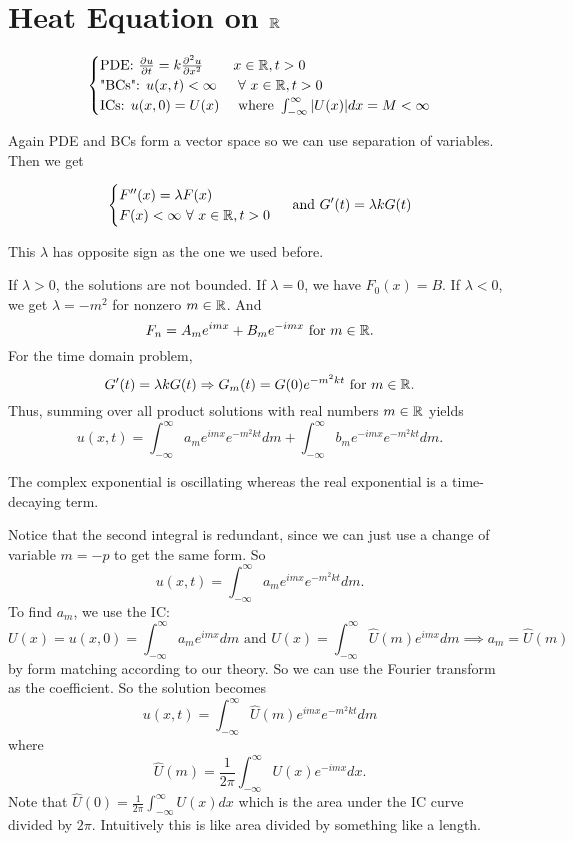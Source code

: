 \documentclass[class=article,crop=false]{standalone}
\begin{document}
\newpage
\section{Heat Equation on $ \mathbb{R}$}

\begin{equation*}
\begin{cases}
	\text{PDE: } \frac{\partial u}{\partial t} = k \frac{\partial^2 u}{\partial { x}^2} & x \in \mathbb{R}, t>0 \\
	\text{"BCs": } u(x,t)< \infty  & \ \forall \ x \in \mathbb{R}, t>0 \\
	\text{ICs: } u(x,0)= U(x) & \text{ where } \int_{-\infty}^{\infty} |U(x)|dx = M < \infty   \\
\end{cases}
\end{equation*}

Again PDE and BCs form a vector space so we can use separation of variables. Then we get

\begin{equation*}
\begin{cases}
	F''(x)= \lambda F(x)\\
	F(x) < \infty \ \forall \ x \in \mathbb{R}, t>0\\
\end{cases}
\text{ and } G'(t) = \lambda k G(t)
\end{equation*}
\begin{note}[]
This $ \lambda$ has opposite sign as the one we used before.
\end{note}
If $ \lambda >0$, the solutions are not bounded. If $ \lambda = 0$, we have $ F_0(x) = B$. If  $ \lambda < 0$, we get $ \lambda = -m^2$ for nonzero $ m \in \mathbb{R}$. And
\[
F_n=A_m e^{imx} + B_m e^{-imx} \text{ for } m \in \mathbb{R} 
.\] 
For the time domain problem,
\[
	G'(t) = \lambda k G(t) \Rightarrow G_m(t) = G(0) e^{-m^2 kt} \text{ for } m \in \mathbb{R} 
.\] 
Thus, summing over all product solutions with real numbers $ m \in \mathbb{R}$ yields
\[
	u(x,t) = \int_{-\infty}^{\infty} a_m e^{imx} e^{-m^2kt} d m + \int_{-\infty}^{\infty} b_m e^{-imx} e^{-m^2kt} d m  
.\] 
\begin{note}[]
The complex exponential is oscillating whereas the real exponential is a time-decaying term.
\end{note}
Notice that the second integral is redundant, since we can just use a change of variable $ m=-p$ to get the same form. So
 \[
	 u(x,t) = \int_{-\infty}^{\infty} a_m e^{imx} e^{-m^2kt} d m  
.\]
To find $ a_m$, we use the IC:
 \[
	 U(x) = u(x,0) = \int_{-\infty}^{\infty} a_m e^{imx}d m \text{ and } U(x) = \int_{-\infty}^{\infty} \hat{ U}(m) e^{imx} d m \implies a_m = \hat{ U}(m)   
\] 
by form matching according to our theory. So we can use the Fourier transform as the coefficient. So the solution becomes
\[
	u(x,t) = \int_{-\infty}^{\infty} \hat{ U}(m) e^{imx}e^{-m^2kt} d m
\]
where
\[
	\hat{ U}(m) = \frac{1}{2\pi} \int_{-\infty}^{\infty} U(x) e^{-imx} dx 
.\] 
Note that $ \hat{ U}(0) = \frac{1}{2\pi} \int_{-\infty}^{\infty} U(x) dx$ which is the area under the IC curve divided by $ 2\pi$.  Intuitively this is like area divided by something like a length.
\end{document}
